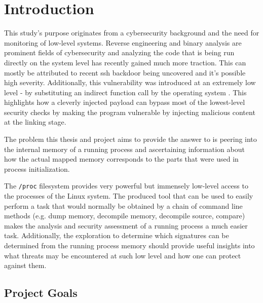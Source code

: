 \chapter{Introduction}
\label{cha:intro}

This study's purpose originates from a cybersecurity background and the need for monitoring of low-level systems.
Reverse engineering and binary analysis are prominent fields of cybersecurity and analyzing the code that is being run directly on the system level has recently gained much more traction.
This can mostly be attributed to recent ssh backdoor being uncovered \cite{collin_xz_2024} and it's possible high severity.
Additionally, this vulnerability was introduced at an extremely low level - by substituting an indirect function call by the operating system \cite{freund_oss-security_2024}.
This highlights how a cleverly injected payload can bypass most of the lowest-level security checks by making the program vulnerable by injecting malicious content at the linking stage.

The problem this thesis and project aims to provide the answer to is peering into the internal memory of a running process and ascertaining information about how the actual mapped memory corresponds to the parts that were used in process initialization.

The \verb|/proc| filesystem provides very powerful but immensely low-level access to the processes of the Linux system. \cite{kerrisk_proc_2010}
The produced tool that can be used to easily perform a task that would normally be obtained by a chain of command line methods (e.g. dump memory, decompile memory, decompile source, compare) makes the analysis and security assessment of a running process a much easier task.
Additionally, the exploration to determine which signatures can be determined from the running process memory should provide useful insights into what threats may be encountered at such low level and how one can protect against them.


\section{Project Goals}
\label{sec:goals}

